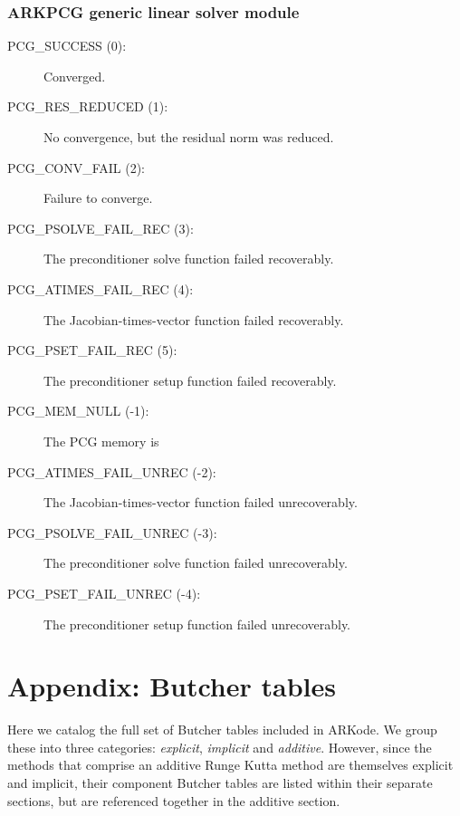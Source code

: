 \documentclass[letterpaper,10pt,english]{sphinxmanual}
\begin{document}
\subsection{ARKPCG generic linear solver module}
\label{Constants:arkpcg-generic-linear-solver-module}\begin{description}
\item[{PCG\_SUCCESS  (0):}] \leavevmode
Converged.

\item[{PCG\_RES\_REDUCED  (1):}] \leavevmode
No convergence, but the residual norm
was reduced.

\item[{PCG\_CONV\_FAIL  (2):}] \leavevmode
Failure to converge.

\item[{PCG\_PSOLVE\_FAIL\_REC  (3):}] \leavevmode
The preconditioner solve function
failed recoverably.

\item[{PCG\_ATIMES\_FAIL\_REC  (4):}] \leavevmode
The Jacobian-times-vector function
failed recoverably.

\item[{PCG\_PSET\_FAIL\_REC  (5):}] \leavevmode
The preconditioner setup function
failed recoverably.

\item[{PCG\_MEM\_NULL  (-1):}] \leavevmode
The PCG memory is 

\item[{PCG\_ATIMES\_FAIL\_UNREC  (-2):}] \leavevmode
The Jacobian-times-vector function
failed unrecoverably.

\item[{PCG\_PSOLVE\_FAIL\_UNREC  (-3):}] \leavevmode
The preconditioner solve function
failed unrecoverably.

\item[{PCG\_PSET\_FAIL\_UNREC  (-4):}] \leavevmode
The preconditioner setup function
failed unrecoverably.

\end{description}


\chapter{Appendix: Butcher tables}
\label{Butcher::doc}\label{Butcher:appendix-butcher-tables}\label{Butcher:butcher}
Here we catalog the full set of Butcher tables included in ARKode.
We group these into three categories: \emph{explicit}, \emph{implicit} and
\emph{additive}.  However, since the methods that comprise an additive
Runge Kutta method are themselves explicit and implicit, their
component Butcher tables are listed within their separate
sections, but are referenced together in the additive section.
\end{document}
